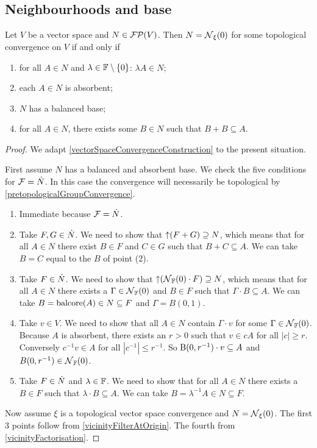 \subsection{Neighbourhoods and base}
\begin{proposition} \label{TVSconstruction}
Let $V$ be a vector space and $N\in\operatorname{\mathcal{FP}}(V)$. Then $N = \operatorname{\mathcal{N}}_\xi(0)$ for some topological convergence on $V$ \textup{if and only if}
\begin{enumerate}
\item for all $A\in N$ and $\lambda\in \mathbb{F}\setminus\{0\}$: $\lambda A\in N$;
\item each $A \in N$ is absorbent;
\item $N$ has a balanced base;
\item for all $A\in N$, there exists some $B\in N$ such that $B+B\subseteq A$.
\end{enumerate}
\end{proposition}
\begin{proof}
We adapt \ref{vectorSpaceConvergenceConstruction} to the present situation.

First assume $N$ has a balanced and absorbent base. We check the five conditions for $\mathcal{F} = \dot{N}$. In this case the convergence will necessarily be topological by \ref{pretopologicalGroupConvergence}.

\begin{enumerate}
\item Immediate because $\mathcal{F} = \dot{N}$.
\item Take $F,G\in \dot{N}$. We need to show that $\operatorname{\uparrow} (F + G) \supseteq N$, which means that for all $A \in N$ there exist $B\in F$ and $C\in G$ such that $B+C\subseteq A$. We can take $B = C$ equal to the $B$ of point (2).
\item Take $F\in \dot{N}$. We need to show that $\operatorname{\uparrow}(\operatorname{\mathcal{N}}_{\mathbb{F}}(0)\cdot F) \supseteq N$, which means that for all $A\in N$ there exists a $\Gamma\in \operatorname{\mathcal{N}}_{\mathbb{F}}(0)$ and $B\in F$ such that $\Gamma \cdot B\subseteq A$. We can take $B = \operatorname{balcore}(A) \in N \subseteq F$ and $\Gamma = B(0,1)$.
\item Take $v\in V$. We need to show that all $A\in N$ contain $\Gamma\cdot v$ for some $\Gamma \in \operatorname{\mathcal{N}}_{\mathbb{F}}(0)$. Because $A$ is absorbent, there exists an $r>0$ such that $v\in cA$ for all $|c|\geq r$. Conversely $c^{-1}v \in A$ for all $|c^{-1}| \leq r^{-1}$. So $\operatorname{B}(0,r^{-1})\cdot v \subseteq A$ and $B(0,r^{-1}) \in \operatorname{\mathcal{N}}_{\mathbb{F}}(0)$.
\item Take $F\in \dot{N}$ and $\lambda\in \mathbb{F}$. We need to show that for all $A\in N$ there exists a $B\in F$ such that $\lambda\cdot B\subseteq A$. We can take $B = \lambda^{-1}A \in N\subseteq F$.
\end{enumerate}

Now assume $\xi$ is a topological vector space convergence and $N = \operatorname{\mathcal{N}}_\xi(0)$. The first 3 points follow from \ref{vicinityFilterAtOrigin}. The fourth from \ref{vicinityFactorisation}.
\end{proof}
